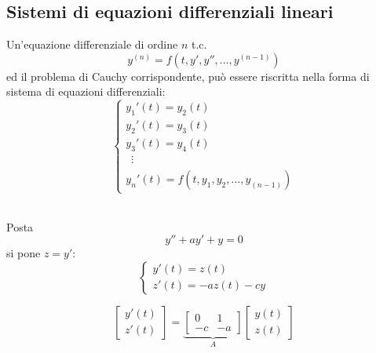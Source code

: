 \subsection{Sistemi di equazioni differenziali lineari}
Un'equazione differenziale di ordine $n$ t.c. 
\[
    y^{(n)} = f(t, y', y'', \dotsc, y^{(n-1)})
\]
ed il problema di Cauchy corrispondente, può essere riscritta nella forma di sistema di equazioni differenziali: 
\begin{equation}
    \left\{
    \begin{array}{l}
        y_1' (t) = y_2(t) \\
        y_2' (t) = y_3(t) \\
        y_3' (t) = y_4(t) \\
        \phantom{y} \vdots \\
        y_n'(t) = f(t, y_1, y_2, \dotsc, y_{(n-1)})
    \end{array} \right.
\end{equation}


\es\\
Posta
\[ y'' + ay' + y = 0 \]
si pone $z = y'$:
\begin{equation}        
    \begin{cases}
        y'(t) = z(t)\\
        z'(t) = -az(t) - cy
    \end{cases}
\end{equation}

\[
    \left[  
        \begin{matrix}
            y'(t) \\ z'(t)
        \end{matrix} 
    \right] = \underbrace{\left[
        \begin{matrix}
            0 & 1 \\ -c & -a
        \end{matrix}
    \right]}_{A} \left[
        \begin{matrix}
            y(t) \\ z(t)
        \end{matrix}
    \right]
\]

